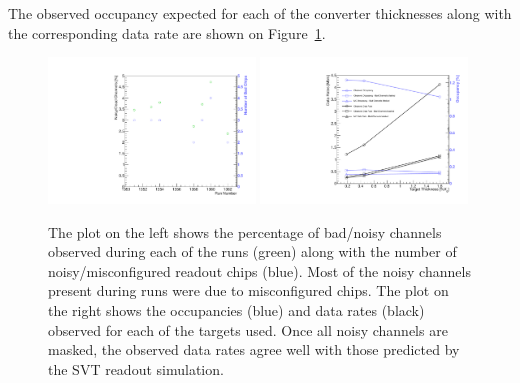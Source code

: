 The observed occupancy expected for each of the converter thicknesses along with the 
corresponding data rate are shown on Figure~\ref{fig:data_rates}.
\begin{figure}[h]
    \begin{center}
    	\includegraphics[width=0.49\textwidth]{test2012/svtperformance/daq_performance/n_dead_channels.pdf}
    	\includegraphics[width=0.49\textwidth]{test2012/svtperformance/daq_performance/data_rates.pdf}
        \caption{
                    The plot on the left shows the percentage of bad/noisy channels observed
                    during each of the runs (green) along with the number of noisy/misconfigured 
                    readout chips (blue).  Most of the noisy channels present during runs were
                    due to misconfigured chips.  The  plot on the right shows the occupancies (blue)
                    and data rates (black) observed for each of the targets used.  Once all noisy channels
                    are masked, the observed data rates agree well with those predicted by the
                    SVT readout simulation. 
                } 
	\label{fig:data_rates}
    \end{center}
\end{figure}

